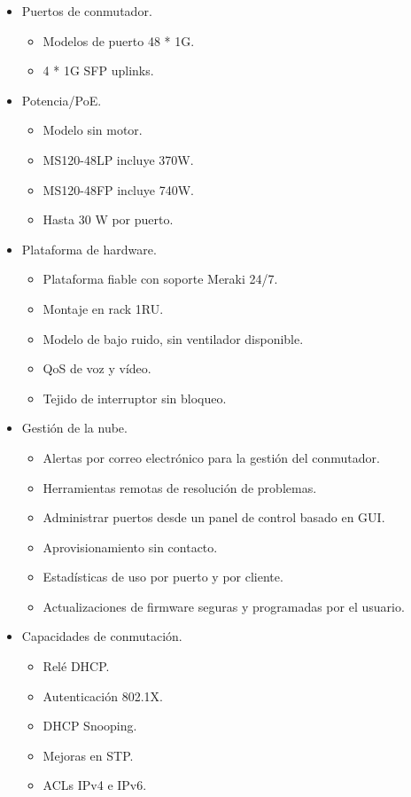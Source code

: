 \documentclass[12pt,letterpaper]{article}
\begin{document}
\begin{itemize} 
    \item Puertos de conmutador.
         \begin{itemize} 
            \item Modelos de puerto 48 * 1G.
            \item 4 * 1G SFP uplinks.
         \end{itemize}
    \item Potencia/PoE.
        \begin{itemize}
            \item Modelo sin motor.
            \item MS120-48LP incluye 370W.
            \item MS120-48FP incluye 740W.
            \item Hasta 30 W por puerto.
        \end{itemize}
    \item Plataforma de hardware.
        \begin{itemize}
            \item Plataforma fiable con soporte Meraki 24/7.
            \item Montaje en rack 1RU.
            \item Modelo de bajo ruido, sin ventilador disponible.
            \item QoS de voz y vídeo.
            \item Tejido de interruptor sin bloqueo.
        \end{itemize}
    \item Gestión de la nube.
        \begin{itemize} 
            \item Alertas por correo electrónico para la gestión del conmutador.
            \item  Herramientas remotas de resolución de problemas.
            \item Administrar puertos desde un panel de control basado en GUI.
            \item Aprovisionamiento sin contacto.
            \item Estadísticas de uso por puerto y por cliente.
            \item Actualizaciones de firmware seguras y programadas por el usuario.
        \end{itemize}
    \item Capacidades de conmutación.
        \begin{itemize} 
            \item Relé DHCP.
            \item Autenticación 802.1X.
            \item DHCP Snooping.
            \item Mejoras en STP.
            \item ACLs IPv4 e IPv6.
        \end{itemize}
\end{itemize}
\end{document}
